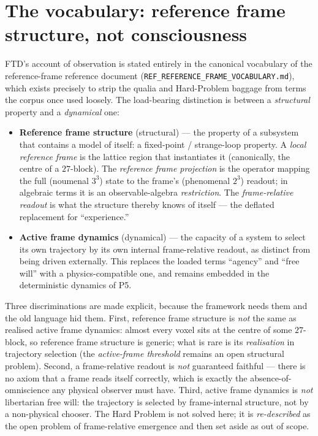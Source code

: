 \section{The vocabulary: reference frame structure, not consciousness}
\label{sec:phil-vocab}

FTD's account of observation is stated entirely in the canonical vocabulary of
the reference-frame reference document
(\texttt{REF\_REFERENCE\_FRAME\_VOCABULARY.md}), which exists precisely to strip
the qualia and Hard-Problem baggage from terms the corpus once used loosely. The
load-bearing distinction is between a \emph{structural} property and a
\emph{dynamical} one:

\begin{itemize}[leftmargin=1.4em,itemsep=2pt,topsep=2pt]
  \item \textbf{Reference frame structure} (structural) --- the property of a
    subsystem that contains a model of itself: a fixed-point / strange-loop
    property. A \emph{local reference frame} is the lattice region that
    instantiates it (canonically, the centre of a $27$-block). The
    \emph{reference frame projection} is the operator mapping the full
    (noumenal $3^3$) state to the frame's (phenomenal $2^3$) readout; in
    algebraic terms it is an observable-algebra \emph{restriction}. The
    \emph{frame-relative readout} is what the structure thereby knows of itself
    --- the deflated replacement for ``experience.''
  \item \textbf{Active frame dynamics} (dynamical) --- the capacity of a system
    to select its own trajectory by its own internal frame-relative readout, as
    distinct from being driven externally. This replaces the loaded terms
    ``agency'' and ``free will'' with a physics-compatible one, and remains
    embedded in the deterministic dynamics of P5.
\end{itemize}

Three discriminations are made explicit, because the framework needs them and
the old language hid them. First, reference frame structure is \emph{not} the
same as realised active frame dynamics: almost every voxel sits at the centre of
some $27$-block, so reference frame structure is generic; what is rare is its
\emph{realisation} in trajectory selection (the \emph{active-frame threshold}
remains an open structural problem). Second, a frame-relative readout is
\emph{not} guaranteed faithful --- there is no axiom that a frame reads itself
correctly, which is exactly the absence-of-omniscience any physical observer
must have. Third, active frame dynamics is \emph{not} libertarian free will: the
trajectory is selected by frame-internal structure, not by a non-physical
chooser. The Hard Problem is not solved here; it is \emph{re-described} as the
open problem of frame-relative emergence and then set aside as out of scope.

